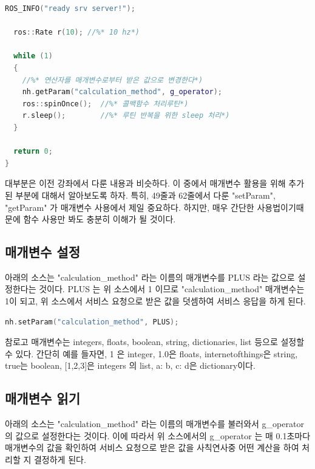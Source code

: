 \begin{lstlisting}[language=C++]
  ROS_INFO("ready srv server!");
   
  ros::Rate r(10); //%* 10 hz*)
 
  while (1)
  {
    //%* 연산자를 매개변수로부터 받은 값으로 변경한다*)
    nh.getParam("calculation_method", g_operator);  
    ros::spinOnce();  //%* 콜백함수 처리루틴*)
    r.sleep();        //%* 루틴 반복을 위한 sleep 처리*)
  }
 
  return 0;
}
\end{lstlisting}

대부분은 이전 강좌에서 다룬 내용과 비슷하다. 이 중에서 매개변수 활용을 위해 추가된 부분에 대해서 알아보도록 하자. 특히, 49줄과 62줄에서 다룬 "setParam", "getParam" 가 매개변수 사용에서 제일 중요하다. 하지만, 매우 간단한 사용법이기때문에 함수 사용만 봐도 충분히 이해가 될 것이다.

\subsection{매개변수 설정}

아래의 소스는 "calculation\_method" 라는 이름의 매개변수를 PLUS 라는 값으로 설정한다는 것이다. PLUS 는 위 소스에서 1 이므로 "calculation\_method" 매개변수는 1이 되고, 위 소스에서 서비스 요청으로 받은 값을 덧셈하여 서비스 응답을 하게 된다.

\begin{lstlisting}[language=C++]
nh.setParam("calculation_method", PLUS);
\end{lstlisting}

참로고 매개변수는 integers, floats, boolean, string, dictionaries, list 등으로 설정할 수 있다. 간단히 예를 들자면, 1 은 integer, 1.0은 floats, internetofthings은 string, true는 boolean, [1,2,3]은 integers 의 list, {a: b, c: d}은 dictionary이다. 

\subsection{매개변수 읽기}

아래의 소스는 "calculation\_method" 라는 이름의 매개변수를 불러와서 g\_operator 의 값으로 설정한다는 것이다. 이에 따라서 위 소스에서의 g\_operator 는 매 0.1초마다 매개변수의 값을 확인하여 서비스 요청으로 받은 값을 사칙연사중 어떤 계산을 하여 처리할 지 결정하게 된다.

